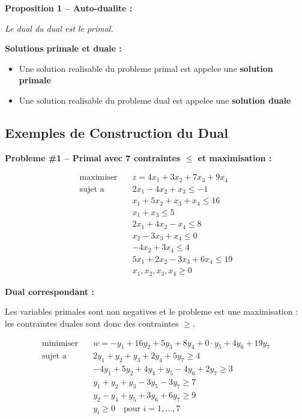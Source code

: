 \documentclass[12pt,a4paper]{article}
\begin{document}
\begin{theoreme}
\textbf{Proposition 1 -- Auto-dualite :}

\textit{Le dual du dual est le primal.}
\end{theoreme}

\begin{definition}
\textbf{Solutions primale et duale :}

\begin{itemize}
    \item Une solution realisable du probleme primal est appelee une \textcolor{titrebleu}{\textbf{solution primale}}
    \item Une solution realisable du probleme dual est appelee une \textcolor{defvert}{\textbf{solution duale}}
\end{itemize}
\end{definition}

\subsection{Exemples de Construction du Dual}

\begin{exemple}
\textbf{Probleme \#1 -- Primal avec 7 contraintes $\leq$ et maximisation :}

\begin{align*}
\text{maximiser} \quad & z = 4x_1 + 3x_2 + 7x_3 + 9x_4\\
\text{sujet a} \quad & 2x_1 - 4x_2 + x_3 \leq -1\\
& x_1 + 5x_2 + x_3 + x_4 \leq 16\\
& x_1 + x_3 \leq 5\\
& 2x_1 + 4x_2 - x_4 \leq 8\\
& x_2 - 3x_3 + x_4 \leq 0\\
& -4x_2 + 3x_4 \leq 4\\
& 5x_1 + 2x_2 - 3x_3 + 6x_4 \leq 19\\
& x_1, x_2, x_3, x_4 \geq 0
\end{align*}

\textbf{Dual correspondant :}

Les variables primales sont non negatives et le probleme est une maximisation : les contraintes duales sont donc des contraintes $\geq$.

\begin{align*}
\text{minimiser} \quad & w = -y_1 + 16y_2 + 5y_3 + 8y_4 + 0 \cdot y_5 + 4y_6 + 19y_7\\
\text{sujet a} \quad & 2y_1 + y_2 + y_3 + 2y_4 + 5y_7 \geq 4\\
& -4y_1 + 5y_2 + 4y_4 + y_5 - 4y_6 + 2y_7 \geq 3\\
& y_1 + y_2 + y_3 - 3y_5 - 3y_7 \geq 7\\
& y_2 - y_4 + y_5 + 3y_6 + 6y_7 \geq 9\\
& y_i \geq 0 \quad \text{pour } i = 1, \ldots, 7
\end{align*}
\end{exemple}
\end{document}
